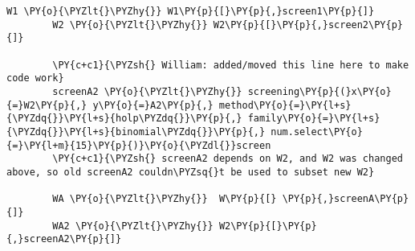 \begin{Verbatim}[commandchars=\\\{\}]
        W1 \PY{o}{\PYZlt{}\PYZhy{}} W1\PY{p}{[}\PY{p}{,}screen1\PY{p}{]}
        W2 \PY{o}{\PYZlt{}\PYZhy{}} W2\PY{p}{[}\PY{p}{,}screen2\PY{p}{]}
        
        \PY{c+c1}{\PYZsh{} William: added/moved this line here to make code work}
        screenA2 \PY{o}{\PYZlt{}\PYZhy{}} screening\PY{p}{(}x\PY{o}{=}W2\PY{p}{,} y\PY{o}{=}A2\PY{p}{,} method\PY{o}{=}\PY{l+s}{\PYZdq{}}\PY{l+s}{holp\PYZdq{}}\PY{p}{,} family\PY{o}{=}\PY{l+s}{\PYZdq{}}\PY{l+s}{binomial\PYZdq{}}\PY{p}{,} num.select\PY{o}{=}\PY{l+m}{15}\PY{p}{)}\PY{o}{\PYZdl{}}screen 
        \PY{c+c1}{\PYZsh{} screenA2 depends on W2, and W2 was changed above, so old screenA2 couldn\PYZsq{}t be used to subset new W2}
        
        WA \PY{o}{\PYZlt{}\PYZhy{}}  W\PY{p}{[} \PY{p}{,}screenA\PY{p}{]}
        WA2 \PY{o}{\PYZlt{}\PYZhy{}} W2\PY{p}{[}\PY{p}{,}screenA2\PY{p}{]}
\end{Verbatim}



